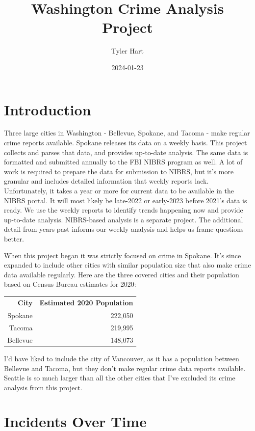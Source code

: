 \documentclass[
  landscape]{article}
\title{Washington Crime Analysis Project}
\author{Tyler Hart}
\date{2024-01-23}
\begin{document}
\maketitle

{
\setcounter{tocdepth}{2}
\tableofcontents
}
\hypertarget{introduction}{%
\section{Introduction}\label{introduction}}

Three large cities in Washington - Bellevue, Spokane, and Tacoma - make
regular crime reports available. Spokane releases its data on a weekly
basis. This project collects and parses that data, and provides
up-to-date analysis. The same data is formatted and submitted annually
to the FBI NIBRS program as well. A lot of work is required to prepare
the data for submission to NIBRS, but it's more granular and includes
detailed information that weekly reports lack. Unfortunately, it takes a
year or more for current data to be available in the NIBRS portal. It
will most likely be late-2022 or early-2023 before 2021's data is ready.
We use the weekly reports to identify trends happening now and provide
up-to-date analysis. NIBRS-based analysis is a separate project. The
additional detail from years past informs our weekly analysis and helps
us frame questions better.

When this project began it was strictly focused on crime in Spokane.
It's since expanded to include other cities with similar population size
that also make crime data available regularly. Here are the three
covered cities and their population based on Census Bureau estimates for
2020:

\begin{longtable}[]{@{}rr@{}}
\toprule\noalign{}
City & Estimated 2020 Population \\
\midrule\noalign{}
\endhead
\bottomrule\noalign{}
\endlastfoot
Spokane & 222,050 \\
Tacoma & 219,995 \\
Bellevue & 148,073 \\
\end{longtable}

I'd have liked to include the city of Vancouver, as it has a population
between Bellevue and Tacoma, but they don't make regular crime data
reports available. Seattle is so much larger than all the other cities
that I've excluded its crime analysis from this project.

\hypertarget{incidents-over-time}{%
\section{Incidents Over Time}\label{incidents-over-time}}
\end{document}
